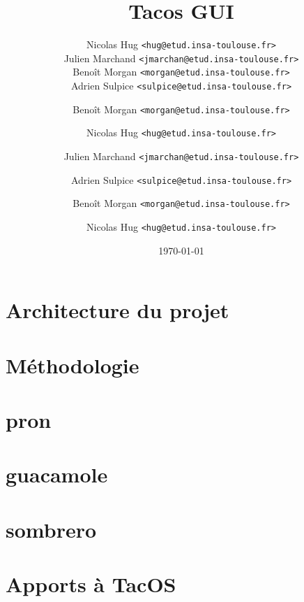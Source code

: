 \documentclass[xcolor=table,12pt]{beamer}
\title{Tacos GUI}
\author[Tacos GUI Team]{
\footnotesize
Nicolas Hug \texttt{<hug@etud.insa-toulouse.fr>}\\
Julien Marchand \texttt{<jmarchan@etud.insa-toulouse.fr>}\\
Benoît Morgan \texttt{<morgan@etud.insa-toulouse.fr>}\\
Adrien Sulpice \texttt{<sulpice@etud.insa-toulouse.fr>}\\
\normalsize
}
\institute{INSA de Toulouse}
\date{\today}
\begin{document}

\frame{\titlepage}


\author{Benoît Morgan \texttt{<morgan@etud.insa-toulouse.fr>}}
\section{Architecture du projet}


\author{Nicolas Hug \texttt{<hug@etud.insa-toulouse.fr>}}
\section{Méthodologie}


\author{Julien Marchand \texttt{<jmarchan@etud.insa-toulouse.fr>}}
\section{pron}


\author{Adrien Sulpice \texttt{<sulpice@etud.insa-toulouse.fr>}}
\section{guacamole}


\author{Benoît Morgan \texttt{<morgan@etud.insa-toulouse.fr>}}
\section{sombrero}


\author{Nicolas Hug \texttt{<hug@etud.insa-toulouse.fr>}}
\section{Apports à TacOS}

\end{document}
